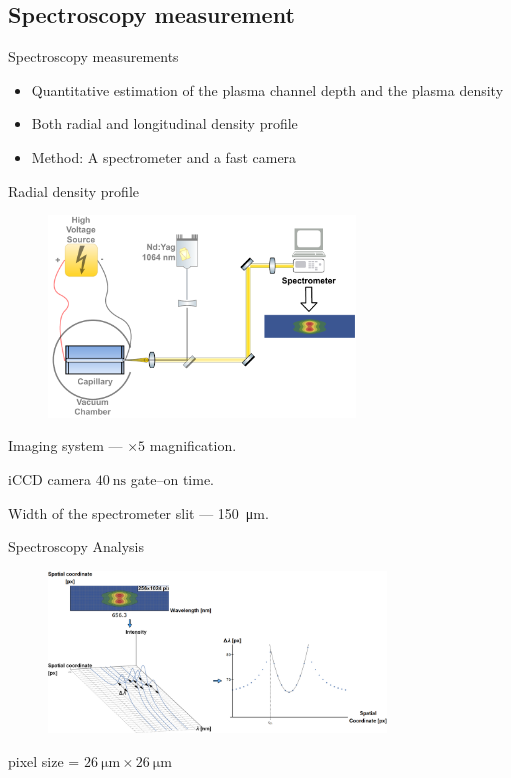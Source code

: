 \documentclass[dvipsnames]{beamer}
\begin{document}
 \subsection{Spectroscopy measurement}
 \begin{frame}{Spectroscopy measurements}
  \begin{itemize}
   \item Quantitative estimation of the plasma channel depth and the plasma density
   \item Both radial and longitudinal density profile
   \item Method: A spectrometer and a fast camera
  \end{itemize}
 \end{frame}
\begin{frame}{Radial density profile}
 \begin{figure}
\includegraphics[height=152pt]{figures/results/spectro/radial_system.pdf}
 \end{figure}
Imaging system --- $\times 5$ magnification.

iCCD camera $\SI{40}{\ns}$ gate--on time. 

Width of the spectrometer slit --- \SI{150}{\um}.
\end{frame}
\begin{frame}{Spectroscopy Analysis}
\begin{figure}
\includegraphics[width=0.8\textwidth]{figures/results/spectro/spectra_analysis.png}
 \end{figure}
 pixel size = $\SI{26}{\um} \times \SI{26}{\um}$
\end{frame}
\end{document}
